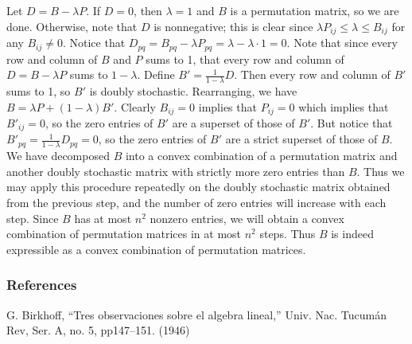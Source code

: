 \documentclass[12pt]{article}
\begin{document}
%
Let $D=B-\lambda P$.  If $D=0$, then $\lambda=1$ and $B$ is a permutation matrix, so we are done.  Otherwise, note that $D$ is nonnegative; this is clear since $\lambda P_{ij} \leq \lambda \leq B_{ij}$ for any $B_{ij} \neq 0$.
%
Notice that $D_{pq}=B_{pq}-\lambda P_{pq} = \lambda - \lambda \cdot 1 = 0$.
%
Note that since every row and column of $B$ and $P$ sums to 1, that every row and column of $D=B-\lambda P$ sums to $1-\lambda$.  Define $B'=\frac{1}{1-\lambda}D$.  Then every row and column of $B'$ sums to 1, so $B'$ is doubly stochastic.
%
Rearranging, we have $B=\lambda P + (1-\lambda) B'$.  Clearly $B_{ij}=0$ implies that $P_{ij}=0$ which implies that $B'_{ij}=0$, so the zero entries of $B'$ are a superset of those of $B'$.  But notice that $B'_{pq}=\frac{1}{1-\lambda} D_{pq}=0$, so the zero entries of $B'$ are a strict superset of those of $B$.
%
We have decomposed $B$ into a convex combination of a permutation matrix and another doubly stochastic matrix with strictly more zero entries than $B$.  Thus we may apply this procedure repeatedly on the doubly stochastic matrix obtained from the previous step, and the number of zero entries will increase with each step.  Since $B$ has at most $n^2$ nonzero entries, we will obtain a convex combination of permutation matrices in at most $n^2$ steps.
%
Thus $B$ is indeed expressible as a convex combination of permutation matrices.
%
\subsubsection*{References}
G. Birkhoff, ``Tres observaciones sobre el algebra lineal,'' Univ. Nac. Tucum{\'a}n Rev, Ser. A, no. 5, pp147--151. (1946)
\end{document}
